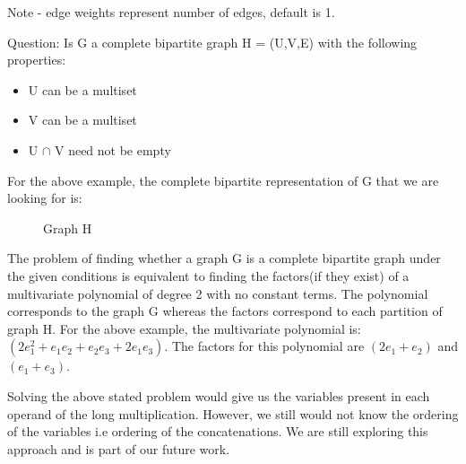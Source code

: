 Note - edge weights represent number of edges, default is 1.

\newpage

Question: Is G a complete bipartite graph H = (U,V,E) with the following properties:

\begin{itemize}
\item U can be a multiset
\item V can be a multiset
\item U $\cap$ V need not be empty
\end{itemize}

For the above example, the complete bipartite representation of G that we are looking for is: 
\begin{figure}[h]

\begin{center}

\caption{Graph H}

\end{center}
\end{figure}

The problem of finding whether a graph G is a complete bipartite graph under the given conditions is equivalent to finding the factors(if they exist) of a multivariate polynomial of degree 2 with no constant terms. The polynomial corresponds to the graph G whereas the factors correspond to each partition of graph H. For the above example, the multivariate polynomial is:
$(2 e_1^2 + e_1e_2 + e_2e_3 + 2 e_1e_3)$. The factors for this polynomial are $(2 e_1 + e_2)$ and $(e_1 + e_3)$.

Solving the above stated problem would give us the variables present in each operand of the long multiplication. However, we still would not know the ordering of the variables i.e ordering of the concatenations. We are still exploring this approach and is part of our future work.
